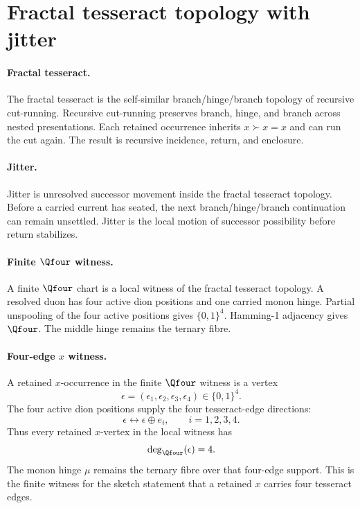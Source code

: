 \section{Fractal tesseract topology with jitter}\label{sec:fractal-tesseract-jittering}

\paragraph{Fractal tesseract.}
The fractal tesseract is the self-similar branch/hinge/branch topology of recursive cut-running. Recursive cut-running preserves branch, hinge, and branch across nested presentations. Each retained occurrence inherits \(x\succ x=x\) and can run the cut again. The result is recursive incidence, return, and enclosure.

\paragraph{Jitter.}
Jitter is unresolved successor movement inside the fractal tesseract topology. Before a carried current has seated, the next branch/hinge/branch continuation can remain unsettled. Jitter is the local motion of successor possibility before return stabilizes.

\paragraph{Finite \(\Qfour\) witness.}
A finite \(\Qfour\) chart is a local witness of the fractal tesseract topology. A resolved duon has four active dion positions and one carried monon hinge. Partial unspooling of the four active positions gives \(\{0,1\}^4\). Hamming-1 adjacency gives \(\Qfour\). The middle hinge remains the ternary fibre.


\paragraph{Four-edge \(x\) witness.}
A retained \(x\)-occurrence in the finite \(\Qfour\) witness is a vertex
\[
\epsilon=(\epsilon_1,\epsilon_2,\epsilon_3,\epsilon_4)\in\{0,1\}^4.
\]
The four active dion positions supply the four tesseract-edge directions:
\[
\epsilon \leftrightarrow \epsilon\oplus e_i,
\qquad i=1,2,3,4.
\]
Thus every retained \(x\)-vertex in the local witness has
\[
\deg_{\Qfour}(\epsilon)=4.
\]
The monon hinge \(\mu\) remains the ternary fibre over that four-edge support. This is the finite witness for the sketch statement that a retained \(x\) carries four tesseract edges.

